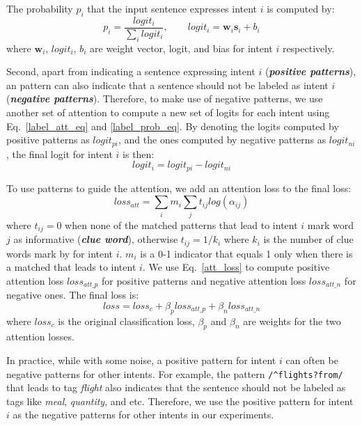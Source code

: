 The probability $p_i$ that the input sentence expresses intent $i$ is computed by:
\begin{equation}
p_i = \frac{logit_i}{\sum_{i}{logit_i}}, \quad\quad logit_i=\textbf{w}_i\textbf{s}_i + b_i 
\label{label_prob_eq}
\end{equation}
where $\textbf{w}_i$, $logit_i$, $b_i$ are weight vector, logit, and bias for intent $i$ respectively.

Second, apart from indicating a sentence expressing intent $i$ (\textbf{\emph{positive patterns}}), an \RE pattern can also indicate that a sentence should not be labeled as intent $i$ (\textbf{\emph{negative patterns}}). Therefore, to make use of negative patterns, we use another set of attention to compute a new set of logits for each intent using Eq.~\ref{label_att_eq} and \ref{label_prob_eq}. By denoting the logits computed by positive patterns as $logit_{pi}$, and the ones computed by negative patterns as $logit_{ni}$, the final logit for intent $i$ is then: 
\begin{equation}
logit_i = logit_{pi} - logit_{ni}
\end{equation}

To use \RE patterns to guide the attention, we add an attention loss to the final loss:
\begin{equation}
loss_{att} = \sum_{i}{m_i\sum_{j}{t_{ij}log(\alpha_{ij})}}
\label{att_loss}
\end{equation}
where $t_{ij} = 0$ when none of the matched patterns that lead to intent $i$ mark word $j$ as informative (\textbf{\emph{clue word}}), otherwise $t_{ij} = 1/k_{i}$ where $k_i$ is the number of clue words mark by \RE for intent $i$. $m_i$ is a 0-1 indicator that equals 1 only when there is a matched \RE that leads to intent $i$. We use Eq.~\ref{att_loss} to compute positive attention loss $loss_{att\_p}$ for positive patterns and negative attention loss $loss_{att\_n}$ for negative ones. The final loss is:
\begin{equation}
loss = loss_{c} + \beta_p loss_{att\_p} + \beta_n loss_{att\_n}
\end{equation} 
where $loss_{c}$ is the original classification loss, $\beta_p$ and $\beta_n$ are weights for the two attention losses.

In practice, while with some noise, a positive pattern for intent $i$ can often be negative patterns for other intents. For example, the pattern \texttt{/\textasciicircum flights?\:from/} that leads to tag \emph{flight} also indicates that the sentence should not be labeled as tags like \emph{meal}, \emph{quantity}, and etc.
Therefore, we use the positive pattern for intent $i$ as the negative patterns for other intents in our experiments.


